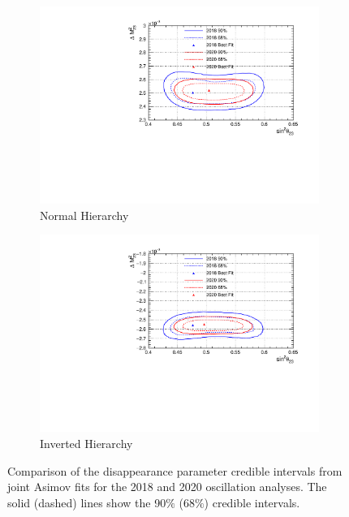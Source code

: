 \begin{figure}[!htbp]
\centering
\begin{subfigure}{.7\textwidth}
  \centering
  \includegraphics[width=0.95\linewidth]{figs/compMaCh3Contours_20182020/compMaCh3Contours_20182020_woRC_disapp_data_NH}
  \caption{Normal Hierarchy}
  \label{fig:20182020DisNH}
\end{subfigure}
\begin{subfigure}{.7\textwidth}
  \centering
  \includegraphics[width=0.95\linewidth]{figs/compMaCh3Contours_20182020/compMaCh3Contours_20182020_woRC_disapp_data_IH}
  \caption{Inverted Hierarchy}
  \label{fig:20182020DisIH}
\end{subfigure}
\caption{Comparison of the disappearance parameter credible intervals from joint Asimov fits for the 2018 and 2020 oscillation analyses. The solid (dashed) lines show the 90$\%$ ($68\%$) credible intervals.}
\label{fig:20182020Dis}
\end{figure}

